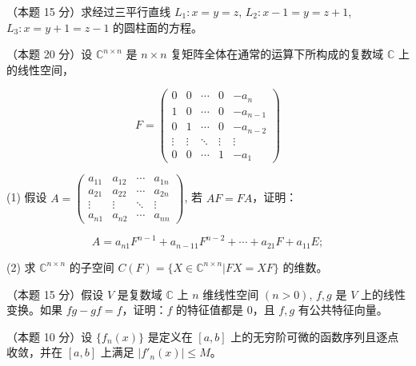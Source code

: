 \documentclass[loose]{ExBook}
\begin{document}
\begin{qitems}
    \begin{bbox}
        \qitem（本题 15 分）求经过三平行直线 \( L_1: x = y = z \), \( L_2: x - 1 = y = z + 1 \), \( L_3: x = y + 1 = z - 1 \) 的圆柱面的方程。
    \end{bbox}

    \begin{bbox}
        \qitem（本题 20 分）设 \( \mathbb{C}^{n \times n} \) 是 \( n \times n \) 复矩阵全体在通常的运算下所构成的复数域 \(\mathbb{C}\) 上的线性空间，
        
        \[F = 
        \begin{pmatrix}
        0 & 0 & \cdots & 0 & -a_n \\
        1 & 0 & \cdots & 0 & -a_{n-1} \\
        0 & 1 & \cdots & 0 & -a_{n-2} \\
        \vdots & \vdots & \ddots & \vdots & \vdots \\
        0 & 0 & \cdots & 1 & -a_1
        \end{pmatrix}\]
        
        (1) 假设 \( A = 
        \begin{pmatrix}
        a_{11} & a_{12} & \cdots & a_{1n} \\
        a_{21} & a_{22} & \cdots & a_{2n} \\
        \vdots & \vdots & \ddots & \vdots \\
        a_{n1} & a_{n2} & \cdots & a_{nn}
        \end{pmatrix} \), 若 \( AF = FA \)，证明：
        
        \[A = a_{n1} F^{n-1} + a_{n-11} F^{n-2} + \cdots + a_{21} F + a_{11} E;\]
        
        (2) 求 \( \mathbb{C}^{n \times n} \) 的子空间 \( C(F) = \{ X \in \mathbb{C}^{n \times n} | FX = XF \} \) 的维数。
    \end{bbox}

    \begin{bbox}
        \qitem（本题 15 分）假设 \( V \) 是复数域 \(\mathbb{C}\) 上 \( n \) 维线性空间 \((n > 0)\), \( f, g \) 是 \( V \) 上的线性变换。如果 \( fg - gf = f \)，证明：\( f \) 的特征值都是 0，且 \( f, g \) 有公共特征向量。
    \end{bbox}

    \begin{bbox}
        \qitem（本题 10 分）设 \(\{ f_n(x) \}\) 是定义在 \([a, b]\) 上的无穷阶可微的函数序列且逐点收敛，并在 \([a, b]\) 上满足 \(|f'_n(x)| \leq M\)。
        

\end{bbox}
\end{qitems}
\end{document}
